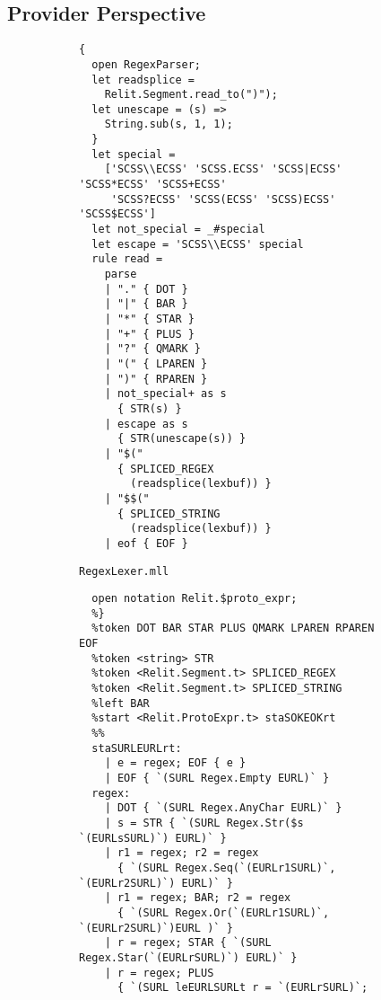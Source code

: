 \documentclass[acmsmall]{acmart}
\newcommand{\li}[1]{\lstinline[basicstyle=\ttfamily\fontsize{9pt}{1em}\selectfont]{#1}}
\begin{document}
\subsection{Provider Perspective}
\label{sec:provider-perspective}
\vspace{-1px}
\begin{figure}
\begin{subfigure}[t]{0.30\textwidth}
\vspace{-8px}
\begin{lstlisting}[morekeywords={rule,parse,eof}]
  { 
  open RegexParser;
  let readsplice = 
    Relit.Segment.read_to(")");
  let unescape = (s) => 
    String.sub(s, 1, 1); 
  }
  let special = 
    ['SCSS\\ECSS' 'SCSS.ECSS' 'SCSS|ECSS' 'SCSS*ECSS' 'SCSS+ECSS' 
     'SCSS?ECSS' 'SCSS(ECSS' 'SCSS)ECSS' 'SCSS$ECSS']
  let not_special = _#special
  let escape = 'SCSS\\ECSS' special
  rule read = 
    parse
    | "." { DOT }
    | "|" { BAR }
    | "*" { STAR }
    | "+" { PLUS }
    | "?" { QMARK }
    | "(" { LPAREN }
    | ")" { RPAREN }
    | not_special+ as s
      { STR(s) }
    | escape as s
      { STR(unescape(s)) }
    | "$(" 
      { SPLICED_REGEX
        (readsplice(lexbuf)) }
    | "$$("  
      { SPLICED_STRING
        (readsplice(lexbuf)) }
    | eof { EOF }
\end{lstlisting}
\vspace{-5px}
\caption{\li{RegexLexer.mll}}
\label{fig:regex-lexer}
\end{subfigure}
\hfill
\begin{subfigure}[t]{0.61\textwidth}
\vspace{-8px}
\begin{lstlisting}[morekeywords={token,left,start},stringstyle=\ttfamily\color{black}]
  %{ 
  open notation Relit.$proto_expr; 
  %}
  %token DOT BAR STAR PLUS QMARK LPAREN RPAREN EOF
  %token <string> STR
  %token <Relit.Segment.t> SPLICED_REGEX 
  %token <Relit.Segment.t> SPLICED_STRING
  %left BAR
  %start <Relit.ProtoExpr.t> staSOKEOKrt
  %%
  staSURLEURLrt:
    | e = regex; EOF { e }
    | EOF { `(SURL Regex.Empty EURL)` }
  regex:
    | DOT { `(SURL Regex.AnyChar EURL)` }
    | s = STR { `(SURL Regex.Str($s `(EURLsSURL)`) EURL)` }
    | r1 = regex; r2 = regex 
      { `(SURL Regex.Seq(`(EURLr1SURL)`, `(EURLr2SURL)`) EURL)` }
    | r1 = regex; BAR; r2 = regex 
      { `(SURL Regex.Or(`(EURLr1SURL)`, `(EURLr2SURL)`)EURL )` }
    | r = regex; STAR { `(SURL Regex.Star(`(EURLrSURL)`) EURL)` }
    | r = regex; PLUS
      { `(SURL leEURLSURLt r = `(EURLrSURL)`;

\end{lstlisting}
\end{subfigure}
\end{figure}
\end{document}
